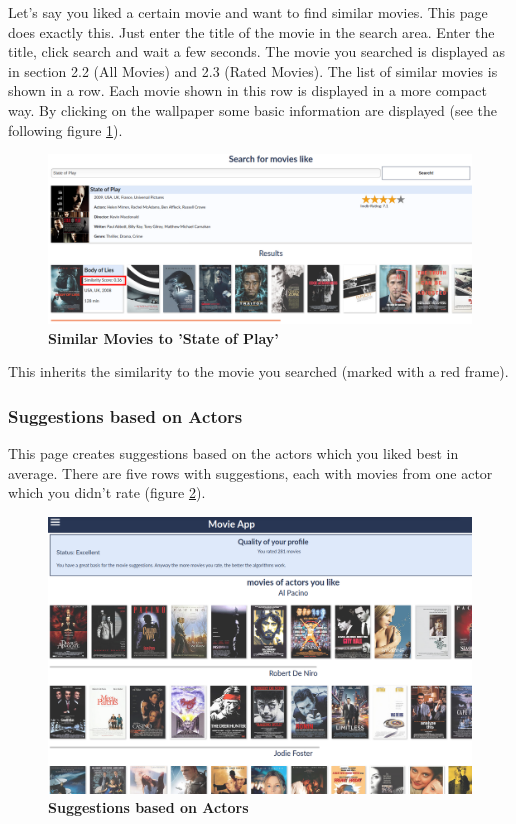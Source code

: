 \documentclass{article}
\begin{document}
Let's say you liked a certain movie and want to find similar movies. This page does exactly this. Just enter the title of the movie in the search area. Enter the title, click search and wait a few seconds. The movie you searched is displayed as in section 2.2 (All Movies) and 2.3 (Rated Movies). The list of similar movies is shown in a row. Each movie shown in this row is displayed in a more compact way. By clicking on the wallpaper some basic information are displayed (see the following figure \ref{fig_suggestion_similarity}).
\begin{figure}[t!]
\includegraphics[scale=0.28]{screenshots_app/suggestion_similarity.png}
\caption{\textbf{Similar Movies to 'State of Play'}}\label{fig_suggestion_similarity}
\end{figure}
This inherits the similarity to the movie you searched (marked with a red frame).


\subsubsection{Suggestions based on Actors}

This page creates suggestions based on the actors which you liked best in average. There are five rows with suggestions, each with movies from one actor which you didn't rate (figure \ref{fig_suggestion_actors}).
\begin{figure}[t!]
\includegraphics[scale=0.25]{screenshots_app/suggestion_actors.png}
\caption{\textbf{Suggestions based on Actors}}\label{fig_suggestion_actors}
\end{figure}
\end{document}
